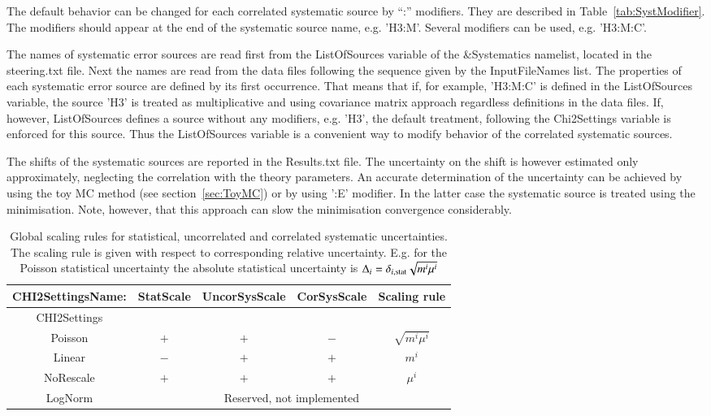 The default behavior can be changed for each correlated systematic source by ``:'' modifiers.
They are described in Table~\ref{tab:SystModifier}. The modifiers should appear at the end 
of the systematic source name, e.g. {\sc 'H3:M'}. Several modifiers can be used, e.g. {\sc 'H3:M:C'}.

The names of systematic error sources are read first from the {\sc ListOfSources} variable of the 
{\sc \&Systematics} namelist, located in the {\sc steering.txt} file. Next the names are read from the
data files following the sequence given by the {\sc InputFileNames} list. The properties of each systematic
error source are defined by its first occurrence. That means that if, for example, {\sc 'H3:M:C'} is defined
in the {\sc ListOfSources} variable, the source {\sc 'H3'} is treated as multiplicative and using covariance
matrix approach regardless definitions in the data files. If, however, {\sc ListOfSources} defines a source
without any modifiers, e.g. {\sc 'H3'}, the default treatment, following the {\sc Chi2Settings} variable is
enforced for this source.
Thus the {\sc ListOfSources } variable is a convenient way to modify behavior of the correlated systematic
sources.

The shifts of the systematic sources are reported in the {\sc Results.txt} file. The uncertainty on the shift
is however estimated only approximately, neglecting the correlation with the theory parameters. An accurate determination
of the uncertainty can be achieved by using the toy MC method (see section~\ref{sec:ToyMC}) or by using {\sc ':E'} 
modifier. In the latter case the systematic source is treated using the \minuit minimisation. Note, however,
that this approach can slow the minimisation convergence considerably.
\begin{table}
\begin{center}
\begin{tabular}{ccccc} 
\hline
{\sc CHI2SettingsName:}   & {\sc StatScale} & {\sc UncorSysScale} & {\sc CorSysScale} & Scaling rule \\
\hline
{\sc CHI2Settings}       &                 &                     &                   &              \\
\hline
  {\sc Poisson}   &  $+$  &  $+$  &  $-$  & $\sqrt{ m^i \mu^i}$ \\
  {\sc Linear}    & $-$   &  $+$  &  $+$  & $m^i$               \\
  {\sc NoRescale} & $+$   &  $+$  &  $+$  & $\mu^i$   \\
  {\sc LogNorm}   &  \multicolumn{4}{c}{Reserved, not implemented} \\
\hline
\end{tabular}
\end{center}
\caption{\label{tab:ErrScale}Global scaling rules for statistical, 
uncorrelated and correlated systematic uncertainties. The scaling
rule is given with respect to corresponding relative uncertainty.
E.g. for the {\sc Poisson} statistical uncertainty the absolute statistical
uncertainty is $\Delta_i = \delta_{i, {\rm stat}}\sqrt{m^i\mu^i}$   }
\end{table}

